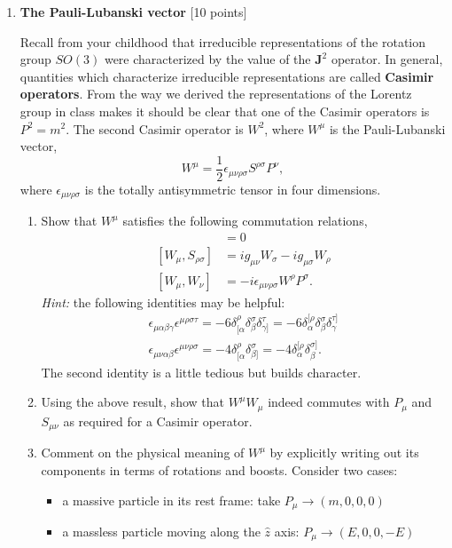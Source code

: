 \documentclass[12pt]{article}
\begin{document}
\begin{enumerate}
\item {\bf The Pauli-Lubanski vector} [10 points]


Recall from your childhood that irreducible representations of the rotation group $SO(3)$ were characterized by the value of the $\mathbf{J}^2$ operator. In general, quantities which characterize irreducible representations are called \textbf{Casimir operators}. From the way we derived the representations of the Lorentz group in class makes it should be clear that one of the Casimir operators is $P^2 = m^2$. The second Casimir operator is $W^2$, where $W^\mu$ is the Pauli-Lubanski vector,
$$W^\mu = \frac 12 \epsilon_{\mu\nu\rho\sigma} S^{\rho\sigma} P^\nu,$$
where $\epsilon_{\mu\nu\rho\sigma}$ is the totally antisymmetric tensor in four dimensions. 

\begin{enumerate}
\item Show that $W^\mu$ satisfies the following commutation relations,
\begin{align*}
	[W_\mu, P_\nu] &= 0\\
	[W_\mu, S_{\rho\sigma}] &= ig_{\mu\nu} W_\sigma - i g_{\mu\sigma} W_\rho\\
	[W_\mu, W_\nu] &= -i\epsilon_{\mu\nu\rho\sigma}W^\rho P^\sigma.
\end{align*}
\textit{Hint:} the following identities may be helpful:
\begin{align*}
\epsilon_{\mu\alpha\beta\gamma}\epsilon^{\mu\rho\sigma\tau}
= -6 \delta^\rho_{[\alpha}\delta^\sigma_\beta\delta^\tau_{\gamma]} = -6 \delta^{[\rho}_\alpha\delta^\sigma_\beta\delta^{\tau]}_\gamma\\
%
\epsilon_{\mu\nu\alpha\beta}\epsilon^{\mu\nu\rho\sigma}
=
-4 \delta^\rho_{[\alpha}\delta^\sigma_{\beta]} = -4\delta^{[\rho}_\alpha\delta^{\sigma]}_\beta.
\end{align*}
The second identity is a little tedious but builds character.

\item Using the above result, show that $W^\mu W_\mu$ indeed commutes with $P_\mu$ and $S_{\mu\nu}$ as required for a Casimir operator.

\item Comment on the physical meaning of $W^\mu$ by explicitly writing out its components in terms of rotations and boosts. Consider two cases:
\begin{itemize}
\item a massive particle in its rest frame:  take $P_\mu \to (m,0,0,0)$
\item a massless particle moving along the $\hat{z}$ axis: $P_\mu \to (E,0,0,-E)$
\end{itemize}
\end{enumerate}


\end{enumerate}
\end{document}
